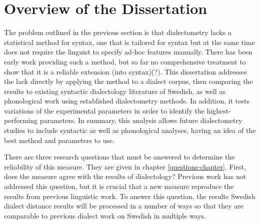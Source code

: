 



\section{Overview of the Dissertation}

The problem outlined in the previous section is that dialectometry
lacks a statistical method for syntax, one that is tailored for syntax
but at the same time does not require the linguist to specify ad-hoc
features manually. There has been early work providing such a method,
but so far no comprehensive treatment to show that it is a reliable
extension (into syntax)(?). This dissertation addresses the lack
directly by applying the method to a dialect corpus, then comparing
the results to existing syntactic dialectology literature of Swedish,
as well as phonological work using established dialectometry
methods. In addition, it tests variations of the experimental
parameters in order to identify the highest-performing parameters. In
summary, this analysis allows future dialectometry studies to include
syntactic as well as phonological analyses, having an idea of the best
method and parameters to use.

There are three research questions that must be answered to determine
the reliability of this measure. They are given in chapter
\ref{questions-chapter}. First, does the measure agree with the
results of dialectology? Previous work has not addressed this
question, but it is crucial that a new measure reproduce the results
from previous linguistic work. To answer this question, the results
Swedish dialect distance results will be processed in a number of ways
so that they are comparable to previous dialect work on Swedish in
multiple ways.

